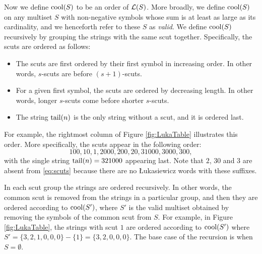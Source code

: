 Now we define $\operatorname{cool}(S)$ to be an order of $\mathcal{L}(S)$.
More broadly, we define $\operatorname{cool}(S)$ on any multiset $S$ with non-negative symbols whose sum is at least as large as its cardinality, and we henceforth refer to these $S$ as \emph{valid}.
We define $\operatorname{cool}(S)$ recursively by grouping the strings with the same scut together.
Specifically, the scuts are ordered as follows:
\begin{itemize}
    \item The scuts are first ordered by their first symbol in increasing order.
    In other words, $s$-scuts are before $(s+1)$-scuts.
    \item For a given first symbol, the scuts are ordered by decreasing length.
    In other words, longer $s$-scuts come before shorter $s$-scuts.
    \item The string $\operatorname{tail}(n)$ is the only string without a scut, and it is ordered last.
\end{itemize}
For example, the rightmost column of Figure \ref{fig:LukaTable} illustrates this order.
More specifically, the scuts appear in the following order:
\begin{equation} \label{eq:scuts}
100, 10, 1, 2000, 200, 20, 31000, 3000, 300,    
\end{equation}
with the single string $\operatorname{tail}(n) = 321000$ appearing last.
Note that $2$, $30$ and $3$ are absent from \eqref{eq:scuts} because there are no Łukasiewicz words with these suffixes.

In each scut group the strings are ordered recursively.
In other words, the common scut is removed from the strings in a particular group, and then they are ordered according to $\operatorname{cool}(S')$, where $S'$ is the valid multiset obtained by removing the symbols of the common scut from $S$.
For example, in Figure \ref{fig:LukaTable}, the strings with scut $1$ are ordered according to $\operatorname{cool}(S')$ where $S' = \{3,2,1,0,0,0\} - \{1\} = \{3,2,0,0,0\}$.
The base case of the recursion is when $S = \emptyset$.

